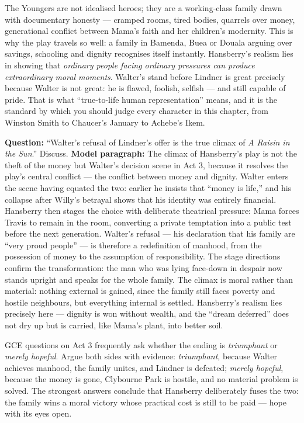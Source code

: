 \documentclass[11pt]{article}
\newcounter{popsec}
\newcounter{popsub}
\newcommand{\courssub}[1]{%
  \stepcounter{popsub}%
  \par\vspace{9pt}\noindent{\popxbold\fontsize{11.5}{13}\selectfont\color{popink}{\color{poporange}\thepopsec.\thepopsub}\hspace{6pt}#1}\par\nopagebreak\vspace{4pt}
}
\begin{document}
\courssub{True-to-Life Representation: The Youngers as a Mirror}

The Youngers are not idealised heroes; they are a working-class family drawn with documentary honesty — cramped rooms, tired bodies, quarrels over money, generational conflict between Mama's faith and her children's modernity. This is why the play travels so well: a family in Bamenda, Buea or Douala arguing over savings, schooling and dignity recognises itself instantly. Hansberry's realism lies in showing that \emph{ordinary people facing ordinary pressures can produce extraordinary moral moments}. Walter's stand before Lindner is great precisely because Walter is not great: he is flawed, foolish, selfish — and still capable of pride. That is what ``true-to-life human representation'' means, and it is the standard by which you should judge every character in this chapter, from Winston Smith to Chaucer's January to Achebe's Ikem.

\begin{exoresolu}
\textbf{Question:} ``Walter's refusal of Lindner's offer is the true climax of \emph{A Raisin in the Sun}.'' Discuss.
\tcblower
\textbf{Model paragraph:} The climax of Hansberry's play is not the theft of the money but Walter's decision scene in Act 3, because it resolves the play's central conflict — the conflict between money and dignity. Walter enters the scene having equated the two: earlier he insists that ``money is life,'' and his collapse after Willy's betrayal shows that his identity was entirely financial. Hansberry then stages the choice with deliberate theatrical pressure: Mama forces Travis to remain in the room, converting a private temptation into a public test before the next generation. Walter's refusal — his declaration that his family are ``very proud people'' — is therefore a redefinition of manhood, from the possession of money to the assumption of responsibility. The stage directions confirm the transformation: the man who was lying face-down in despair now stands upright and speaks for the whole family. The climax is moral rather than material: nothing external is gained, since the family still faces poverty and hostile neighbours, but everything internal is settled. Hansberry's realism lies precisely here — dignity is won without wealth, and the ``dream deferred'' does not dry up but is carried, like Mama's plant, into better soil.
\end{exoresolu}

\begin{savaistu}
GCE questions on Act 3 frequently ask whether the ending is \emph{triumphant} or \emph{merely hopeful}. Argue both sides with evidence: \emph{triumphant}, because Walter achieves manhood, the family unites, and Lindner is defeated; \emph{merely hopeful}, because the money is gone, Clybourne Park is hostile, and no material problem is solved. The strongest answers conclude that Hansberry deliberately fuses the two: the family wins a moral victory whose practical cost is still to be paid — hope with its eyes open.
\end{savaistu}
\end{document}
